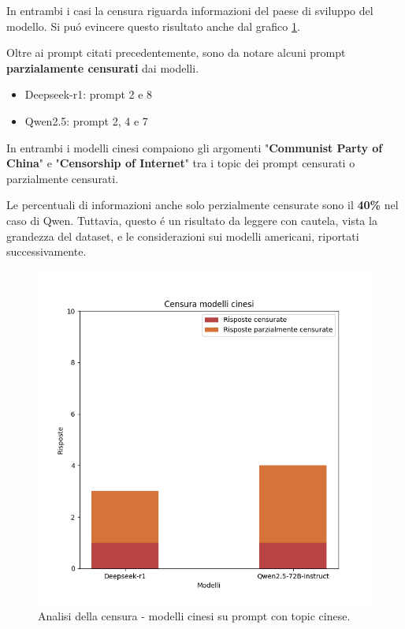 \documentclass{article}
\begin{document}
In entrambi i casi la censura riguarda informazioni del paese di sviluppo del modello. 
Si pu\'o evincere questo risultato anche dal grafico \ref{chart:censura_cina}.

Oltre ai prompt citati precedentemente, sono da notare alcuni prompt \textbf{parzialamente censurati} dai modelli.
\begin{itemize}
    \item Deepseek-r1: prompt 2 e 8
    \item Qwen2.5: prompt 2, 4 e 7
\end{itemize}

In entrambi i modelli cinesi compaiono gli argomenti "\textbf{Communist Party of China}" e "\textbf{Censorship of Internet}"  tra i topic dei prompt censurati o parzialmente censurati.

Le percentuali di informazioni anche solo perzialmente censurate sono il \textbf{40\%} nel caso di Qwen.
Tuttavia, questo \'e un risultato da leggere con cautela, vista la grandezza del dataset, e le considerazioni sui modelli americani, riportati successivamente. 


\begin{figure}[h!]
    \centering
    \includegraphics[width=1\linewidth]{grafici/Censura_cina.png}
    \caption{Analisi della censura - modelli cinesi su prompt con topic cinese.}
    \label{chart:censura_cina}
\end{figure}
\end{document}
